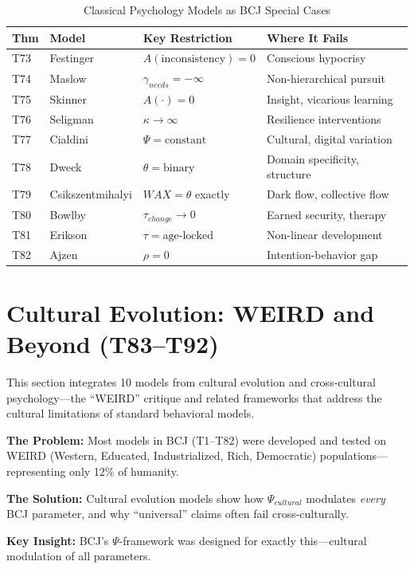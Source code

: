 \begin{table}[htbp]
\centering
\caption{Classical Psychology Models as BCJ Special Cases}
\label{tab:psychology-boundaries}
\renewcommand{\arraystretch}{1.2}
\begin{tabular}{@{}llp{4cm}p{4cm}@{}}
\toprule
\textbf{Thm} & \textbf{Model} & \textbf{Key Restriction} & \textbf{Where It Fails} \\
\midrule
T73 & Festinger & $A(\text{inconsistency}) = 0$ & Conscious hypocrisy \\
T74 & Maslow & $\gamma_{needs} = -\infty$ & Non-hierarchical pursuit \\
T75 & Skinner & $A(\cdot) = 0$ & Insight, vicarious learning \\
T76 & Seligman & $\kappa \to \infty$ & Resilience interventions \\
T77 & Cialdini & $\Psi = \text{constant}$ & Cultural, digital variation \\
T78 & Dweck & $\theta = \text{binary}$ & Domain specificity, structure \\
T79 & Csikszentmihalyi & $WAX = \theta$ exactly & Dark flow, collective flow \\
T80 & Bowlby & $\tau_{change} \to 0$ & Earned security, therapy \\
T81 & Erikson & $\tau = \text{age-locked}$ & Non-linear development \\
T82 & Ajzen & $\rho = 0$ & Intention-behavior gap \\
\bottomrule
\end{tabular}
\end{table}


\section{Cultural Evolution: WEIRD and Beyond (T83--T92)}
\label{sec:bcj-cultural-evolution}

This section integrates 10 models from cultural evolution and cross-cultural psychology---the ``WEIRD'' critique and related frameworks that address the cultural limitations of standard behavioral models.

\begin{tcolorbox}[colback=purple!5!white, colframe=purple!75!black,
    title=Why Cultural Evolution Matters for BCJ]
\textbf{The Problem:} Most models in BCJ (T1--T82) were developed and tested on WEIRD (Western, Educated, Industrialized, Rich, Democratic) populations---representing only 12\% of humanity.

\textbf{The Solution:} Cultural evolution models show how $\Psi_{cultural}$ modulates \textit{every} BCJ parameter, and why ``universal'' claims often fail cross-culturally.

\textbf{Key Insight:} BCJ's $\Psi$-framework was designed for exactly this---cultural modulation of all parameters.
\end{tcolorbox}

